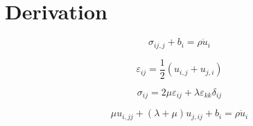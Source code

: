\documentclass{article}
\begin{document}
\section{Derivation}

\begin{equation}
\sigma_{ij,j} + b_i = \rho \ddot{u}_i
\end{equation}

\begin{equation}
\varepsilon_{ij} = \frac{1}{2} \left(u_{i,j} + u_{j,i}\right)
\end{equation}

\begin{equation}
\sigma_{ij} = 2 \mu \varepsilon_{ij} + \lambda \varepsilon_{kk} \delta_{ij}
\end{equation}


\begin{equation}
\mu u_{i,jj} + \left(\lambda + \mu\right) u_{j,ij} + b_i = \rho \ddot{u}_i
\end{equation}
\end{document}
